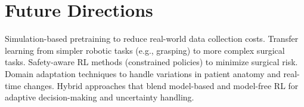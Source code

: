 
\chapter{Future Directions}

Simulation-based pretraining to reduce real-world data collection costs.
Transfer learning from simpler robotic tasks (e.g., grasping) to more complex surgical tasks.
Safety-aware RL methods (constrained policies) to minimize surgical risk.
Domain adaptation techniques to handle variations in patient anatomy and real-time changes.
Hybrid approaches that blend model-based and model-free RL for adaptive decision-making and uncertainty handling.

